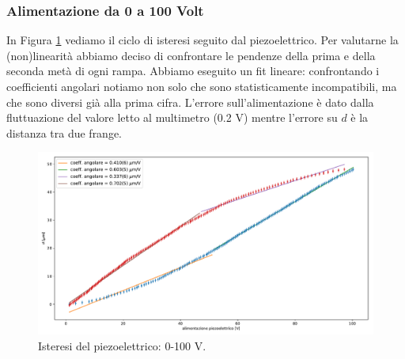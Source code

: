 \documentclass[a4paper]{article}
\begin{document}
\subsubsection{Alimentazione da 0 a 100 Volt}
In Figura \ref{fig:0-100} vediamo il ciclo di isteresi seguito dal piezoelettrico. Per valutarne la (non)linearità abbiamo deciso di confrontare le pendenze della prima e della seconda metà di ogni rampa. Abbiamo eseguito un fit lineare: confrontando i coefficienti angolari notiamo non solo che sono statisticamente incompatibili, ma che sono diversi già alla prima cifra.
L'errore sull'alimentazione è dato dalla fluttuazione del valore letto al multimetro (0.2 V) mentre l'errore su $d$ è la distanza tra due frange.
\begin{figure}[H]
	\includegraphics[width=1\textwidth]{isteresi_0-100.pdf}
	\caption{Isteresi del piezoelettrico: 0-100 V.}
	\label{fig:0-100}
\end{figure}
\end{document}
